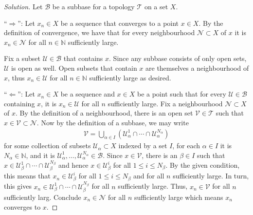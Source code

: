 \documentclass[a4paper]{article}
\theoremstyle{definition}
\begin{document}
\begin{proof}[Solution]
    Let \(\mathcal{B}\) be a subbase for a topology \(\mathcal{T}\) on a set \(X\).

    ``\(\Rightarrow\)'': Let \(x_n \in X\) be a sequence that converges to a point \(x \in X\). By the definition of convergence, we have that for every neighbourhood \(\mathcal{N} \subset X\) of \(x\) it is \(x_n \in \mathcal{N}\) for all \(n \in \mathbb{N}\) sufficiently large.

    Fix a subset \(\mathcal{U} \in \mathcal{B}\) that contains \(x\). Since any subbase consists of only open sets, \(\mathcal{U}\) is open as well. Open subsets that contain \(x\) are themselves a neighbourhood of \(x\), thus \(x_n \in \mathcal{U}\) for all \(n \in \mathbb{N}\) sufficiently large as desired.

    ``\(\Leftarrow\)'': Let \(x_n \in X\) be a sequence and \(x \in X\) be a point such that for every \(\mathcal{U} \in \mathcal{B}\) containing \(x\), it is \(x_n \in \mathcal{U}\) for all \(n\) sufficiently large. Fix a neighbourhood \(\mathcal{N} \subset X\) of \(x\). By the definition of a neighbourhood, there is an open set \(\mathcal{V} \in \mathcal{T}\) such that \(x \in \mathcal{V} \subset \mathcal{N}\). Now by the definition of a subbase, we may write
    \begin{align*}
        \mathcal{V} = \bigcup_{\alpha \in I} \left( \mathcal{U}_\alpha^1 \cap \cdots \cap \mathcal{U}_\alpha^{N_\alpha} \right)
    \end{align*}
    for some collection of subsets \(\mathcal{U}_\alpha \subset X\) indexed by a set \(I\), for each \(\alpha \in I\) it is \(N_\alpha \in \mathbb{N}\), and it is \(\mathcal{U}_\alpha^1, \ldots, \mathcal{U}_\alpha^{N_\alpha} \in \mathcal{B}\). Since \(x \in \mathcal{V}\), there is an \(\beta \in I\) such that \(x \in \mathcal{U}_\beta^1 \cap \cdots \cap \mathcal{U}_\beta^{N_\beta}\) and hence \(x \in \mathcal{U}_\beta^{i}\) for all \(1 \leq i \leq N_\beta\). By the given condition, this means that \(x_n \in \mathcal{U}_\beta^i\) for all \(1 \leq i \leq N_\beta\) and for all \(n\) sufficiently large. In turn, this gives \(x_n \in \mathcal{U}_\beta^1 \cap \cdots \cap \mathcal{U}_\beta^{N_\beta}\) for all \(n\) sufficiently large. Thus, \(x_n \in \mathcal{V}\) for all \(n\) sufficiently larg. Conclude \(x_n \in \mathcal{N}\) for all \(n\) sufficiently large which means \(x_n\) converges to \(x\).
\end{proof}
\end{document}
